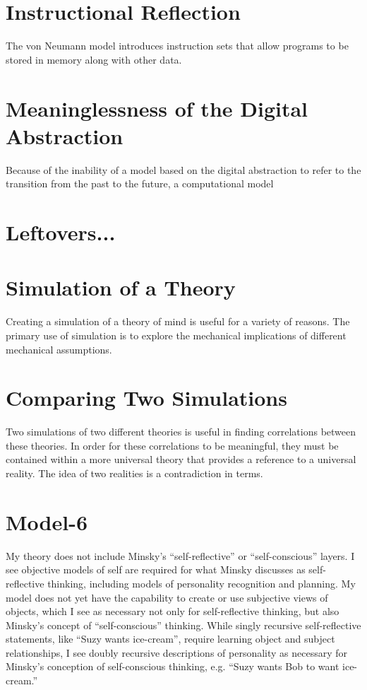 \section{Instructional Reflection}

The von Neumann model introduces instruction sets that allow programs
to be stored in memory along with other data.

\section{Meaninglessness of the Digital Abstraction}



Because of the inability of a model based on the digital abstraction
to refer to the transition from the past to the future, a
computational model

\section{Leftovers...}

\section{Simulation of a Theory}

Creating a simulation of a theory of mind is useful for a variety of
reasons.  The primary use of simulation is to explore the mechanical
implications of different mechanical assumptions.

\section{Comparing Two Simulations}

Two simulations of two different theories is useful in finding
correlations between these theories.  In order for these correlations
to be meaningful, they must be contained within a more universal
theory that provides a reference to a universal reality.  The idea of
two realities is a contradiction in terms.


\section{Model-6}

My theory does not include Minsky's ``self-reflective'' or
``self-conscious'' layers.  I see objective models of self are
required for what Minsky discusses as self-reflective thinking,
including models of personality recognition and planning.  My model
does not yet have the capability to create or use subjective views of
objects, which I see as necessary not only for self-reflective
thinking, but also Minsky's concept of ``self-conscious'' thinking.
While singly recursive self-reflective statements, like ``Suzy wants
ice-cream'', require learning object and subject relationships, I see
doubly recursive descriptions of personality as necessary for Minsky's
conception of self-conscious thinking, e.g. ``Suzy wants Bob to want
ice-cream.''

